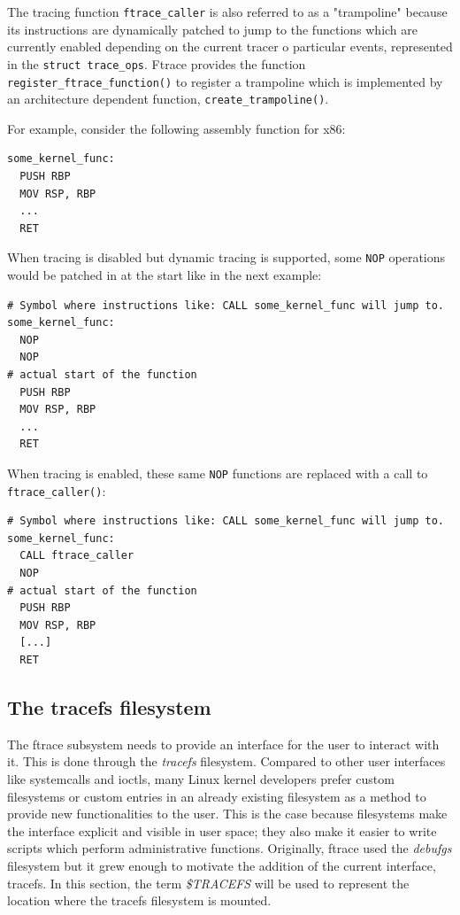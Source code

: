 The tracing function \verb|ftrace_caller| is also referred to as a "trampoline"
because its instructions are dynamically patched to jump to the functions which
are currently enabled depending on the current tracer o particular events,
represented in the \verb|struct trace_ops|. Ftrace provides the function
\verb|register_ftrace_function()| to register a trampoline which is implemented
by an architecture dependent function, \verb|create_trampoline()|.

For example, consider the following assembly function for x86:

\begin{verbatim}
some_kernel_func:
  PUSH RBP
  MOV RSP, RBP
  ...
  RET
\end{verbatim}

When tracing is disabled but dynamic tracing is supported, some \verb|NOP|
operations would be patched in at the start like in the next example:

\begin{verbatim}
# Symbol where instructions like: CALL some_kernel_func will jump to.
some_kernel_func:
  NOP
  NOP
# actual start of the function
  PUSH RBP
  MOV RSP, RBP
  ...
  RET
\end{verbatim}

When tracing is enabled, these same \verb|NOP| functions are replaced with a
call to \verb|ftrace_caller()|:

\begin{verbatim}
# Symbol where instructions like: CALL some_kernel_func will jump to.
some_kernel_func:
  CALL ftrace_caller
  NOP
# actual start of the function
  PUSH RBP
  MOV RSP, RBP
  [...]
  RET
\end{verbatim}

\subsection{The tracefs filesystem}

The ftrace subsystem needs to provide an interface for the user to interact with
it. This is done through the \textit{tracefs} filesystem. Compared to other user
interfaces like systemcalls and ioctls, many Linux kernel developers prefer
custom filesystems or custom entries in an already existing filesystem as a
method to provide new functionalities to the user. This is the case because
filesystems make the interface explicit and visible in user space; they also
make it easier to write scripts which perform administrative functions.
Originally, ftrace used the \textit{debufgs} filesystem but it grew enough to
motivate the addition of the current interface, tracefs. In this section, the
term \textit{\$TRACEFS} will be used to represent the location where the tracefs
filesystem is mounted.

